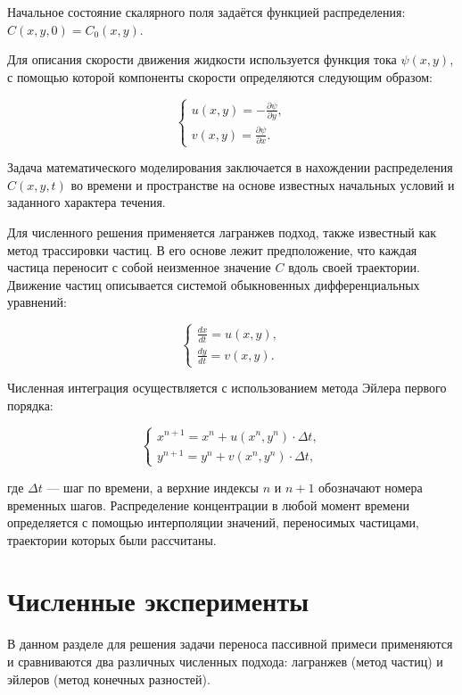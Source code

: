 \documentclass[a4paper,12pt]{article}
\begin{document}
Начальное состояние скалярного поля задаётся функцией распределения:
$C(x,y,0) = C_0(x,y).$

Для описания скорости движения жидкости используется функция тока $\psi(x,y)$, с помощью которой компоненты скорости определяются следующим образом:

$$
\begin{cases}
u(x,y) = -\frac{\partial \psi}{\partial y},\\
v(x,y) = \frac{\partial \psi}{\partial x}.
\end{cases}
$$

Задача математического моделирования заключается в нахождении распределения $C(x,y,t)$ во времени и пространстве на основе известных начальных условий и заданного характера течения.

Для численного решения применяется лагранжев подход, также известный как метод трассировки частиц. В его основе лежит предположение, что каждая частица переносит с собой неизменное значение $C$ вдоль своей траектории. Движение частиц описывается системой обыкновенных дифференциальных уравнений:

$$
\begin{cases}
\frac{dx}{dt} = u(x,y),\\
\frac{dy}{dt} = v(x,y).
\end{cases}
$$

Численная интеграция осуществляется с использованием метода Эйлера первого порядка:

$$
\begin{cases}
x^{n+1} = x^n + u(x^n, y^n) \cdot \Delta t,\\
y^{n+1} = y^n + v(x^n, y^n) \cdot \Delta t,
\end{cases}
$$

где $\Delta t$ — шаг по времени, а верхние индексы $n$ и $n+1$ обозначают номера временных шагов. Распределение концентрации в любой момент времени определяется с помощью интерполяции значений, переносимых частицами, траектории которых были рассчитаны.

\newpage


\section{Численные эксперименты}

В данном разделе для решения задачи переноса пассивной примеси применяются и сравниваются два различных численных подхода: лагранжев (метод частиц) и эйлеров (метод конечных разностей).
\end{document}
